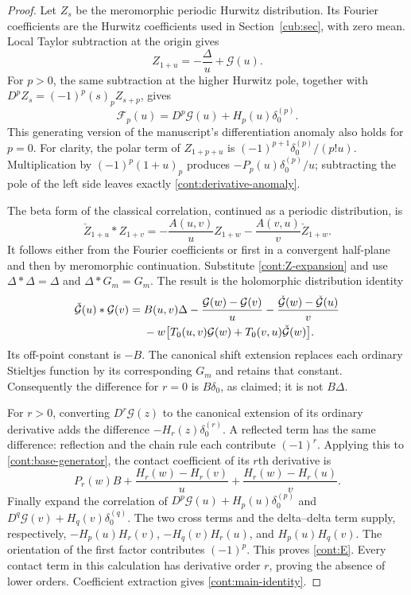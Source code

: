 \documentclass[11pt,a4paper]{article}
\theoremstyle{definition}
\theoremstyle{remark}
\numberwithin{equation}{section}
\begin{document}
\begin{proof}
Let $Z_s$ be the meromorphic periodic Hurwitz distribution.  Its
Fourier coefficients are the Hurwitz coefficients used in
Section~\ref{cub:sec}, with zero mean.  Local Taylor subtraction at
the origin gives
\begin{equation}\label{cont:Z-expansion}
 Z_{1+u}=-\frac\Delta u+\mathcal G(u).
\end{equation}
For $p>0$, the same subtraction at the higher Hurwitz pole, together
with $D^pZ_s=(-1)^p(s)_pZ_{s+p}$, gives
\begin{equation}\label{cont:derivative-anomaly}
 \mathcal F_p(u)=D^p\mathcal G(u)+H_p(u)\delta_0^{(p)}.
\end{equation}
This generating version of the manuscript's differentiation anomaly
also holds for $p=0$.  For clarity, the polar term of
$Z_{1+p+u}$ is $(-1)^{p+1}\delta_0^{(p)}/(p!u)$.
Multiplication by $(-1)^p(1+u)_p$ produces
$-P_p(u)\delta_0^{(p)}/u$; subtracting the pole of the left side
leaves exactly \eqref{cont:derivative-anomaly}.

The beta form of the classical correlation, continued as a periodic
distribution, is
\[
 \check Z_{1+u}*Z_{1+v}
 =-\frac{A(u,v)}u Z_{1+w}
   -\frac{A(v,u)}v\check Z_{1+w}.
\]
It follows either from the Fourier coefficients or first in a
convergent half-plane and then by meromorphic continuation.
Substitute \eqref{cont:Z-expansion} and use
$\Delta*\Delta=\Delta$ and $\Delta*G_m=G_m$.
The result is the holomorphic distribution identity
\begin{align}
 \check{\mathcal G}(u)*\mathcal G(v)
 ={}&B(u,v)\Delta
 -\frac{\mathcal G(w)-\mathcal G(v)}u
 -\frac{\check{\mathcal G}(w)-\check{\mathcal G}(u)}v
       \notag\\
 &-w\bigl[T_0(u,v)\mathcal G(w)
              +T_0(v,u)\check{\mathcal G}(w)\bigr].
 \label{cont:base-generator}
\end{align}
Its off-point constant is $-B$.  The canonical shift extension
replaces each ordinary Stieltjes function by its corresponding $G_m$
and retains that constant.  Consequently the difference for $r=0$
is $B\delta_0$, as claimed; it is not $B\Delta$.

For $r>0$, converting $D^r\mathcal G(z)$ to the canonical extension
of its ordinary derivative adds the difference
$-H_r(z)\delta_0^{(r)}$.  A reflected term has the same difference:
reflection and the chain rule each contribute $(-1)^r$.
Applying this to \eqref{cont:base-generator}, the contact coefficient
of its $r$th derivative is
\[
 P_r(w)B+
 \frac{H_r(w)-H_r(v)}u+
 \frac{H_r(w)-H_r(u)}v.
\]
Finally expand the correlation of
$D^p\mathcal G(u)+H_p(u)\delta_0^{(p)}$ and
$D^q\mathcal G(v)+H_q(v)\delta_0^{(q)}$.
The two cross terms and the delta--delta term supply, respectively,
$-H_p(u)H_r(v)$, $-H_q(v)H_r(u)$, and $H_p(u)H_q(v)$.
The orientation of the first factor contributes $(-1)^p$.
This proves \eqref{cont:E}.  Every contact term in this calculation
has derivative order $r$, proving the absence of lower orders.
Coefficient extraction gives \eqref{cont:main-identity}.
\end{proof}
\end{document}
